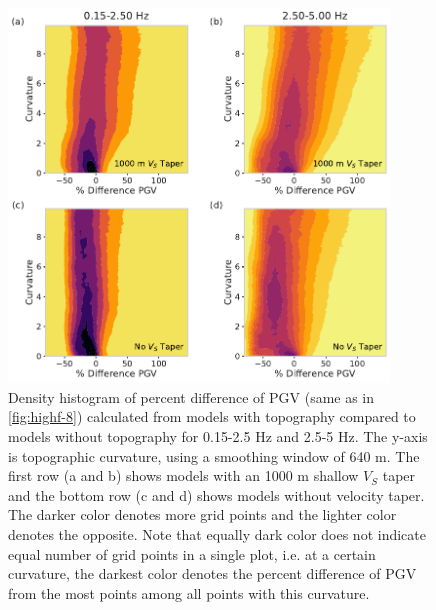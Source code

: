 \begin{figure}[!ht]
  \centering
  \includegraphics[width=0.9\textwidth,height=0.9\textheight,keepaspectratio]{figures/figure_highf_14.pdf}
  \caption{
  Density histogram of percent difference of PGV (same as in \cref{fig:highf-8}) calculated from models with topography compared to models without topography for 0.15-2.5 Hz and 2.5-5 Hz. The y-axis is topographic curvature, using a smoothing window of 640 m. The first row (a and b) shows models with an 1000 m shallow $V_S$ taper and the bottom row (c and d) shows models without velocity taper. The darker color denotes more grid points and the lighter color denotes the opposite. Note that equally dark color does not indicate equal number of grid points in a single plot, i.e. at a certain curvature, the darkest color denotes the percent difference of PGV from the most points among all points with this curvature.
  }
  \label{fig:highf-14}
\end{figure}
\clearpage


